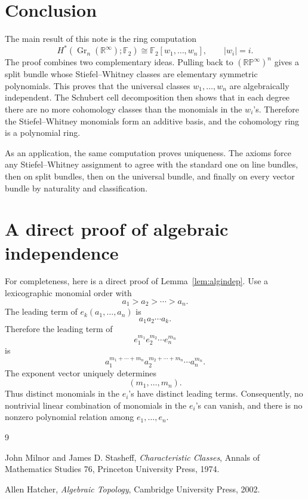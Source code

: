\documentclass[11pt]{article}
\newcommand{\F}{\mathbb F}
\newcommand{\R}{\mathbb R}
\newcommand{\RP}{\mathbb{RP}}
\newcommand{\Gr}{\operatorname{Gr}}
\theoremstyle{plain}
\theoremstyle{definition}
\numberwithin{equation}{section}
\begin{document}
\section{Conclusion}

The main result of this note is the ring computation
\[
  H^*(\Gr_n(\R^\infty);\F_2)
  \cong
  \F_2[w_1,\ldots,w_n],
  \qquad |w_i|=i.
\]
The proof combines two complementary ideas.  Pulling back to $(\RP^\infty)^n$ gives a split bundle whose Stiefel--Whitney classes are elementary symmetric polynomials.  This proves that the universal classes $w_1,\ldots,w_n$ are algebraically independent.  The Schubert cell decomposition then shows that in each degree there are no more cohomology classes than the monomials in the $w_i$'s.  Therefore the Stiefel--Whitney monomials form an additive basis, and the cohomology ring is a polynomial ring.

As an application, the same computation proves uniqueness.  The axioms force any Stiefel--Whitney assignment to agree with the standard one on line bundles, then on split bundles, then on the universal bundle, and finally on every vector bundle by naturality and classification.

\appendix

\section{A direct proof of algebraic independence}

For completeness, here is a direct proof of Lemma~\ref{lem:algindep}.  Use a lexicographic monomial order with
\[
  a_1>a_2>\cdots>a_n.
\]
The leading term of $e_k(a_1,\ldots,a_n)$ is
\[
  a_1a_2\cdots a_k.
\]
Therefore the leading term of
\[
  e_1^{m_1}e_2^{m_2}\cdots e_n^{m_n}
\]
is
\[
  a_1^{m_1+\cdots+m_n}
  a_2^{m_2+\cdots+m_n}
  \cdots
  a_n^{m_n}.
\]
The exponent vector uniquely determines
\[
  (m_1,\ldots,m_n).
\]
Thus distinct monomials in the $e_i$'s have distinct leading terms.  Consequently, no nontrivial linear combination of monomials in the $e_i$'s can vanish, and there is no nonzero polynomial relation among $e_1,\ldots,e_n$.

\begin{thebibliography}{9}

John Milnor and James D. Stasheff,
\emph{Characteristic Classes},
Annals of Mathematics Studies 76,
Princeton University Press, 1974.

Allen Hatcher,
\emph{Algebraic Topology},
Cambridge University Press, 2002.

\end{thebibliography}
\end{document}
